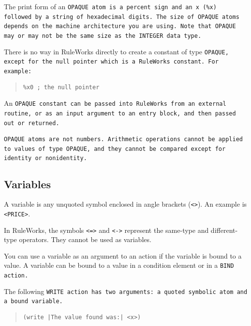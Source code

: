 The print form of an \tt{OPAQUE} atom is a percent sign and an \verb|x|
(\verb|%x|) followed by a string of hexadecimal digits. The size of
\tt{OPAQUE} atoms depends on the machine architecture you are
using. Note that \tt{OPAQUE} may or may not be the same size as
the \tt{INTEGER} data type.

There is no way in RuleWorks directly to create a constant of
type \tt{OPAQUE}, except for the null pointer which is a RuleWorks
constant. For example:

\begin{quote}
\begin{verbatim}
%x0 ; the null pointer
\end{verbatim}
\end{quote}

An \tt{OPAQUE} constant can be passed into RuleWorks from an
external routine, or as an input argument to an entry block,
and then passed out or returned.

\begin{note}
  \tt{OPAQUE} atoms are not numbers. Arithmetic operations cannot be
  applied to values of type \tt{OPAQUE}, and they cannot be compared
  except for identity or nonidentity.
\end{note}

\subsection{Variables}

A variable is any unquoted symbol enclosed in angle brackets
(\verb|<>|). An example is \verb|<PRICE>|.

\begin{note}
  In RuleWorks, the symbols \verb|<=>| and \verb|<->| represent the
  same-type and different-type operators. They cannot be used as
  variables.
\end{note}

You can use a variable as an argument to an action if the variable is
bound to a value. A variable can be bound to a value in a condition
element or in a \tt{BIND} action.

The following \tt{WRITE} action has two arguments: a quoted symbolic
atom and a bound variable.

\begin{quote}
\begin{verbatim}
(write |The value found was:| <x>)
\end{verbatim}
\end{quote}

